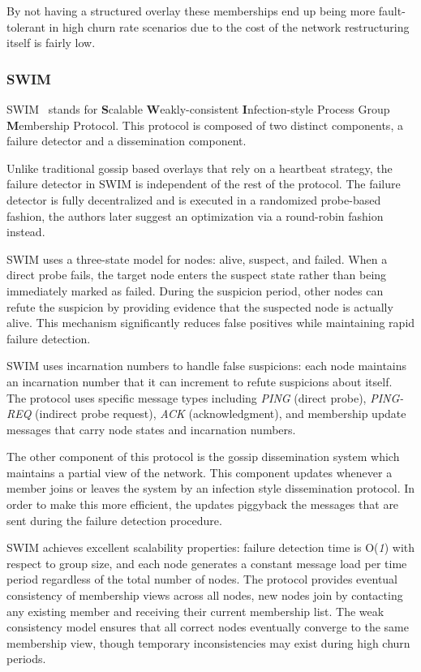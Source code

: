 By not having a structured overlay these memberships end up being more fault-tolerant
in high churn rate scenarios due to the cost of the network restructuring
itself is fairly low.

\subsubsection{SWIM}\label{subsec:swim}

SWIM~\cite{swim} stands for \textbf{S}calable \textbf{W}eakly-consistent \textbf{I}nfection-style
Process Group \textbf{M}embership Protocol. This protocol is composed of two distinct
components, a failure detector and a dissemination component.

Unlike traditional gossip based overlays that rely on a heartbeat strategy,
the failure detector in SWIM is independent of the rest of the protocol.
The failure detector is fully decentralized and is executed in a randomized
probe-based fashion, the authors later suggest an optimization via a round-robin
fashion instead.

SWIM uses a three-state model for nodes: alive, suspect, and failed. When a direct probe fails,
the target node enters the suspect state rather than being immediately marked as failed.
During the suspicion period, other nodes can refute the suspicion by providing evidence
that the suspected node is actually alive. This mechanism significantly reduces false positives
while maintaining rapid failure detection.

SWIM uses incarnation numbers to handle false suspicions: each node maintains an incarnation
number that it can increment to refute suspicions about itself. The protocol uses specific
message types including \textit{PING} (direct probe), \textit{PING-REQ} (indirect probe request), \textit{ACK} (acknowledgment),
and membership update messages that carry node states and incarnation numbers.

The other component of this protocol is the gossip dissemination system which
maintains a partial view of the network. This component updates whenever a member
joins or leaves the system by an infection style dissemination protocol. In order to
make this more efficient, the updates piggyback the messages that are sent during the
failure detection procedure.

SWIM achieves excellent scalability properties: failure detection time is O(\textit{1}) with respect to group size,
and each node generates a constant message load per time period regardless of the total number of nodes.
The protocol provides eventual consistency of membership views across all nodes, new nodes join
by contacting any existing member and receiving their current membership list. The weak consistency model
ensures that all correct nodes eventually converge to the same membership view, though temporary
inconsistencies may exist during high churn periods.

